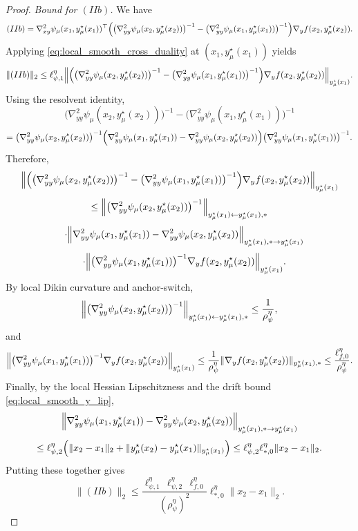 \documentclass{article}
\begin{document}
\begin{proof}
\smallskip
\noindent\emph{Bound for \((IIb)\).}
We have
\[
(IIb)
=
\nabla^2_{xy}\psi_\mu(x_1,y_\mu^\star(x_1))^\top
\Bigl(
\bigl(\nabla^2_{yy}\psi_\mu(x_2,y_\mu^\star(x_2))\bigr)^{-1}
-
\bigl(\nabla^2_{yy}\psi_\mu(x_1,y_\mu^\star(x_1))\bigr)^{-1}
\Bigr)
\nabla_y f(x_2,y_\mu^\star(x_2)).
\]
Applying \eqref{eq:local_smooth_cross_duality} at
\((x_1,y_\mu^\star(x_1))\) yields
\[
\|(IIb)\|_2
\le
\ell_{\psi,1}^\eta
\Bigl\|
\Bigl(
\bigl(\nabla^2_{yy}\psi_\mu(x_2,y_\mu^\star(x_2))\bigr)^{-1}
-
\bigl(\nabla^2_{yy}\psi_\mu(x_1,y_\mu^\star(x_1))\bigr)^{-1}
\Bigr)
\nabla_y f(x_2,y_\mu^\star(x_2))
\Bigr\|_{y_\mu^\star(x_1)}.
\]
Using the resolvent identity,
\[
\bigl(\nabla^2_{yy}\psi_\mu(x_2,y_\mu^\star(x_2))\bigr)^{-1}
-
\bigl(\nabla^2_{yy}\psi_\mu(x_1,y_\mu^\star(x_1))\bigr)^{-1}
\]
\[
=
\bigl(\nabla^2_{yy}\psi_\mu(x_2,y_\mu^\star(x_2))\bigr)^{-1}
\Bigl(
\nabla^2_{yy}\psi_\mu(x_1,y_\mu^\star(x_1))
-
\nabla^2_{yy}\psi_\mu(x_2,y_\mu^\star(x_2))
\Bigr)
\bigl(\nabla^2_{yy}\psi_\mu(x_1,y_\mu^\star(x_1))\bigr)^{-1}.
\]
Therefore,
\[
\Bigl\|
\Bigl(
\bigl(\nabla^2_{yy}\psi_\mu(x_2,y_\mu^\star(x_2))\bigr)^{-1}
-
\bigl(\nabla^2_{yy}\psi_\mu(x_1,y_\mu^\star(x_1))\bigr)^{-1}
\Bigr)
\nabla_y f(x_2,y_\mu^\star(x_2))
\Bigr\|_{y_\mu^\star(x_1)}
\]
\[
\le
\Bigl\|
\bigl(\nabla^2_{yy}\psi_\mu(x_2,y_\mu^\star(x_2))\bigr)^{-1}
\Bigr\|_{y_\mu^\star(x_1)\leftarrow y_\mu^\star(x_1),*}
\]
\[
\quad\cdot
\Bigl\|
\nabla^2_{yy}\psi_\mu(x_1,y_\mu^\star(x_1))
-
\nabla^2_{yy}\psi_\mu(x_2,y_\mu^\star(x_2))
\Bigr\|_{y_\mu^\star(x_1),*\to y_\mu^\star(x_1)}
\]
\[
\quad\cdot
\Bigl\|
\bigl(\nabla^2_{yy}\psi_\mu(x_1,y_\mu^\star(x_1))\bigr)^{-1}
\nabla_y f(x_2,y_\mu^\star(x_2))
\Bigr\|_{y_\mu^\star(x_1)}.
\]
By local Dikin curvature and anchor-switch,
\[
\Bigl\|
\bigl(\nabla^2_{yy}\psi_\mu(x_2,y_\mu^\star(x_2))\bigr)^{-1}
\Bigr\|_{y_\mu^\star(x_1)\leftarrow y_\mu^\star(x_1),*}
\le
\frac{1}{\rho_\psi^\eta},
\]
and
\[
\Bigl\|
\bigl(\nabla^2_{yy}\psi_\mu(x_1,y_\mu^\star(x_1))\bigr)^{-1}
\nabla_y f(x_2,y_\mu^\star(x_2))
\Bigr\|_{y_\mu^\star(x_1)}
\le
\frac{1}{\rho_\psi^\eta}
\|\nabla_y f(x_2,y_\mu^\star(x_2))\|_{y_\mu^\star(x_1),*}
\le
\frac{\ell_{f,0}^\eta}{\rho_\psi^\eta}.
\]
Finally, by the local Hessian Lipschitzness and the drift bound
\eqref{eq:local_smooth_y_lip},
\[
\Bigl\|
\nabla^2_{yy}\psi_\mu(x_1,y_\mu^\star(x_1))
-
\nabla^2_{yy}\psi_\mu(x_2,y_\mu^\star(x_2))
\Bigr\|_{y_\mu^\star(x_1),*\to y_\mu^\star(x_1)}
\]
\[
\le
\ell_{\psi,2}^\eta
\Bigl(
\|x_2-x_1\|_2
+
\|y_\mu^\star(x_2)-y_\mu^\star(x_1)\|_{y_\mu^\star(x_1)}
\Bigr)
\le
\ell_{\psi,2}^\eta\ell_{*,0}^\eta\|x_2-x_1\|_2.
\]
Putting these together gives
\begin{equation}
\label{eq:local_smooth_IIb}
\|(IIb)\|_2
\le
\frac{\ell_{\psi,1}^\eta\,\ell_{\psi,2}^\eta\,\ell_{f,0}^\eta}
{(\rho_\psi^\eta)^2}
\ell_{*,0}^\eta
\|x_2-x_1\|_2.
\end{equation}


\end{proof}
\end{document}
